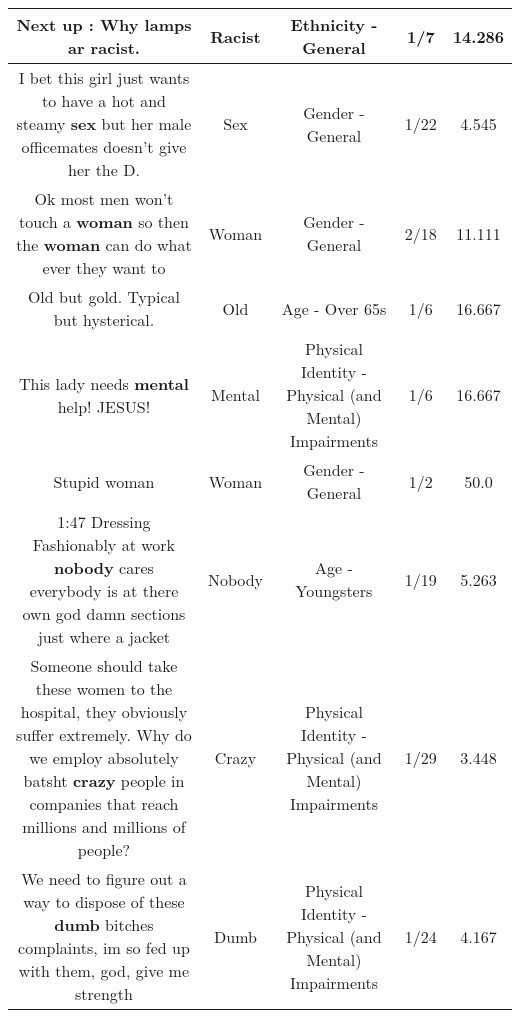 \documentclass[11pt]{article}
\newlength\mylength
\begin{document}
\begin{center}
\begin{longtable}{|C{.65\mylength}|C{.30\mylength}|C{.12\mylength}|C{.12\mylength}|C{.12\mylength}|}
  \small Next up : Why lamps ar \textbf{racist}.\normalsize   & Racist & Ethnicity - General & 1/7 & 14.286 \\  \hline
  \small I bet this girl just wants to have a hot and steamy \textbf{sex} but her male officemates doesn't give her the D.\normalsize   & Sex & Gender - General & 1/22 & 4.545 \\  \hline
  \small Ok most men won't touch a \textbf{woman} so then the \textbf{woman} can do what ever they want to\normalsize   & Woman & Gender - General & 2/18 & 11.111 \\  \hline
  \small Old but gold. Typical but hysterical.\normalsize   & Old & Age - Over 65s & 1/6 & 16.667 \\  \hline
  \small This lady needs \textbf{mental} help! JESUS!\normalsize   & Mental & Physical Identity - Physical (and Mental) Impairments & 1/6 & 16.667 \\  \hline
  \small Stupid woman\normalsize   & Woman & Gender - General & 1/2 & 50.0 \\  \hline
  \small 1:47 Dressing Fashionably at work \textbf{nobody} cares everybody is at there own god damn sections just where a jacket\normalsize   & Nobody & Age - Youngsters & 1/19 & 5.263 \\  \hline
  \small Someone should take these women to the hospital, they obviously suffer extremely. Why do we employ absolutely batsht \textbf{crazy} people in companies that reach millions and millions of people?\normalsize   & Crazy & Physical Identity - Physical (and Mental) Impairments & 1/29 & 3.448 \\  \hline
  \small We need to figure out a way to dispose of these \textbf{dumb} bitches complaints, im so fed up with them, god, give me strength\normalsize   & Dumb & Physical Identity - Physical (and Mental) Impairments & 1/24 & 4.167 \\  \hline

\end{longtable}
\end{center}
\end{document}
